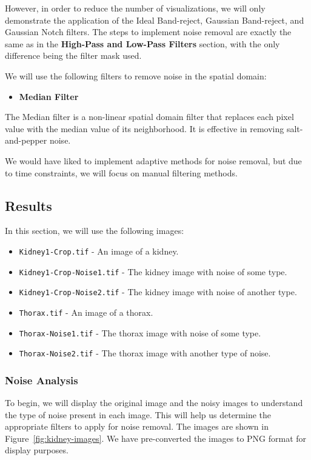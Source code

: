 \documentclass[a4paper,12pt]{article}
\begin{document}
However, in order to reduce the number of visualizations, we will only demonstrate the application of the Ideal Band-reject, Gaussian Band-reject, and Gaussian Notch filters. The steps to implement noise removal are exactly the same as in the \textbf{High-Pass and Low-Pass Filters} section, with the only difference being the filter mask used. 

We will use the following filters to remove noise in the spatial domain:

\begin{itemize}
    \item \textbf{Median Filter}
\end{itemize}

The Median filter is a non-linear spatial domain filter that replaces each pixel value with the median value of its neighborhood. It is effective in removing salt-and-pepper noise.

We would have liked to implement adaptive methods for noise removal, but due to time constraints, we will focus on manual filtering methods.

\subsection{Results}

In this section, we will use the following images:

\begin{itemize}
    \item \texttt{Kidney1-Crop.tif} - An image of a kidney.
    \item \texttt{Kidney1-Crop-Noise1.tif} - The kidney image with noise of some type.
    \item \texttt{Kidney1-Crop-Noise2.tif} - The kidney image with noise of another type.
    \item \texttt{Thorax.tif} - An image of a thorax.
    \item \texttt{Thorax-Noise1.tif} - The thorax image with noise of some type.
    \item \texttt{Thorax-Noise2.tif} - The thorax image with another type of noise.
\end{itemize}

\subsubsection{Noise Analysis}

To begin, we will display the original image and the noisy images to understand the type of noise present in each image. This will help us determine the appropriate filters to apply for noise removal. The images are shown in Figure~\ref{fig:kidney-images}. We have pre-converted the images to PNG format for display purposes.
\end{document}
